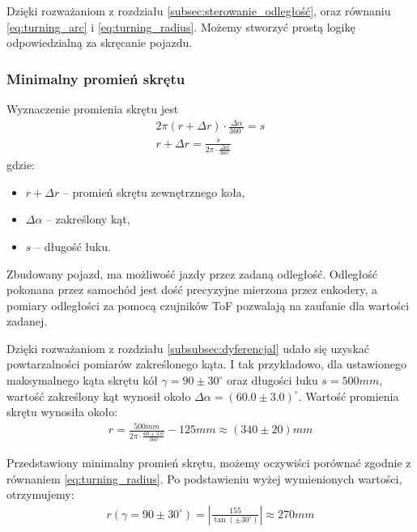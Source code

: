         Dzięki rozważaniom z rozdziału \ref{subsec:sterowanie_odległość}, oraz równaniu \eqref{eq:turning_arc} i \eqref{eq:turning_radius}.
        Możemy stworzyć prostą logikę odpowiedzialną za skręcanie pojazdu.


        \subsubsection{Minimalny promień skrętu}
        \label{subsubsec:minamalny_promien}
            Wyznaczenie promienia skrętu jest 
            \begin{gather}
                2\pi (r + \Delta r) \cdot \frac{\Delta \alpha}{360^\circ} = s\\
                r + \Delta r = \frac{s}{2\pi \cdot \frac{\Delta \alpha}{360^\circ}}
            \end{gather}
            gdzie:
            \begin{itemize}
                \item $r + \Delta r$ -- promień skrętu zewnętrznego koła,
                \item $\Delta \alpha$ -- zakreślony kąt,
                \item $s$ -- długość łuku.
            \end{itemize}

            Zbudowany pojazd, ma możliwość jazdy przez zadaną odległość. 
            Odległość pokonana przez samochód jest dość precyzyjne mierzona przez enkodery,
            a pomiary odległości za pomocą czujników ToF pozwalają na zaufanie dla wartości zadanej.

            Dzięki rozważaniom z rozdziału \ref{subsubsec:dyferencjal} udało się uzyskać powtarzalności pomiarów zakreślonego kąta.
            I tak przykładowo, dla ustawionego maksymalnego kąta skrętu kół $\gamma = 90 \pm 30^\circ$ oraz długości łuku $s = 500mm$, wartość zakreślony kąt wynosił około $\Delta \alpha = \left(60.0 \pm 3.0\right)^\circ$.
            Wartość promienia skrętu wynosiła około:
            \begin{gather}
                r = \frac{500mm}{2\pi \cdot \frac{60 \pm 3.0}{360}} - 125mm \approx (340 \pm 20)mm
            \end{gather}

            Przedstawiony minimalny promień skrętu, możemy oczywiści porównać zgodnie z równaniem \eqref{eq:turning_radius}.
            Po podstawieniu wyżej wymienionych wartości, otrzymujemy:
            \begin{gather}
                r(\gamma = 90 \pm 30^\circ) = \left|\frac{155}{\tan(\pm 30^\circ)}\right| \approx 270mm
            \end{gather}

